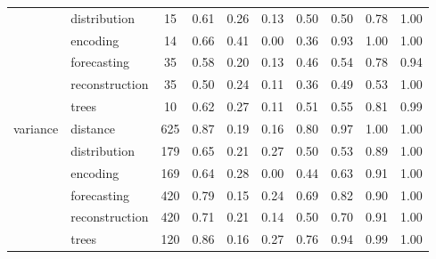 \begin{tabular}{|l|l|c|c|c|c|c|c|c|c|}
 & distribution & 15 & 0.61 & 0.26 & 0.13 & 0.50 & 0.50 & 0.78 & 1.00 \\
 & encoding & 14 & 0.66 & 0.41 & 0.00 & 0.36 & 0.93 & 1.00 & 1.00 \\
 & forecasting & 35 & 0.58 & 0.20 & 0.13 & 0.46 & 0.54 & 0.78 & 0.94 \\
 & reconstruction & 35 & 0.50 & 0.24 & 0.11 & 0.36 & 0.49 & 0.53 & 1.00 \\
 & trees & 10 & 0.62 & 0.27 & 0.11 & 0.51 & 0.55 & 0.81 & 0.99 \\
\cline{1-10}
\multirow[t]{6}{*}{variance} & distance & 625 & 0.87 & 0.19 & 0.16 & 0.80 & 0.97 & 1.00 & 1.00 \\
 & distribution & 179 & 0.65 & 0.21 & 0.27 & 0.50 & 0.53 & 0.89 & 1.00 \\
 & encoding & 169 & 0.64 & 0.28 & 0.00 & 0.44 & 0.63 & 0.91 & 1.00 \\
 & forecasting & 420 & 0.79 & 0.15 & 0.24 & 0.69 & 0.82 & 0.90 & 1.00 \\
 & reconstruction & 420 & 0.71 & 0.21 & 0.14 & 0.50 & 0.70 & 0.91 & 1.00 \\
 & trees & 120 & 0.86 & 0.16 & 0.27 & 0.76 & 0.94 & 0.99 & 1.00 \\
\cline{1-10}
\bottomrule
\end{tabular}
